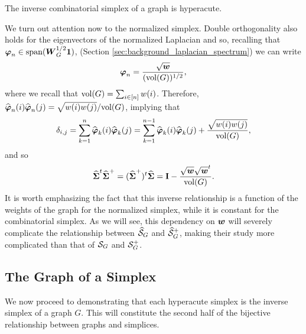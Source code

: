 \begin{observation}
	\label{obs:S^+_hyperacute}
	The inverse combinatorial simplex of a graph is hyperacute. 
\end{observation}

We turn out attention now to the normalized simplex. Double orthogonality also holds for the eigenvectors of the normalized Laplacian and so, recalling that $\vb*{\varphi}_n \in \textnormal{span}(\vb*{W}_G^{1/2}\vb{1} )$, 
(Section \ref{sec:background_laplacian_spectrum}) 
we can write 
\[\vb*{\varphi}_n = \frac{\sqrt{\vb*{w}}}{(\textnormal{vol}(G))^{1/2}},\]
where we recall that $\textnormal{vol}(G)=\sum_{i\in[n]} w(i)$. 
Therefore, $\widehat{\vb*{\varphi}}_{n}(i)\widehat{\vb*{\varphi}}_{n}(j)=\sqrt{w(i)w(j)}/\textnormal{vol}(G)$, implying that 
\begin{equation*}\delta_{i,j}=\sum_{k=1}^n \widehat{\vb*{\varphi}}_k(i)\widehat{\vb*{\varphi}}_k(j) = \sum_{k=1}^{n-1} \widehat{\vb*{\varphi}}_k(i)\widehat{\vb*{\varphi}}_k(j) + \frac{\sqrt{w(i)w(j)}}{\textnormal{vol}(G)},
\end{equation*}
and so 
\begin{equation}
\label{eq:svn+svn}
\widehat{\boldsymbol{\Sigma}}^t\widehat{\boldsymbol{\Sigma}}^+=(\widehat{\boldsymbol{\Sigma}}^+)^t\widehat{\boldsymbol{\Sigma}}=\vb{I}-\frac{\sqrt{\vb*{w}}\sqrt{\vb*{w}}^t}{\textnormal{vol}(G)}.
\end{equation}
It is worth emphasizing the fact that this inverse relationship is a function of the weights of the graph for the normalized simplex, while it is constant for the combinatorial simplex. As we will see, this dependency on $\vb*{w}$ will severely complicate the relationship between $\widehat{\mathcal{S}}_G$ and $\widehat{\mathcal{S}}_G^+$, making their study more complicated than that of $\mathcal{S}_G$ and $\mathcal{S}_G^+$. 


\subsection{The Graph of a Simplex}
\label{sec:simplex_to_graph}
We now proceed to demonstrating that  each hyperacute simplex is the inverse simplex of a graph $G$. This will constitute the second half of the bijective relationship between graphs and simplices. 

